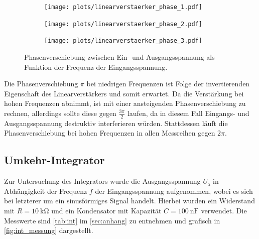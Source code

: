 \begin{figure}[H]
  \centering
  \begin{subfigure}{.65\textwidth}
    \texttt{[image: plots/linearverstaerker\_phase\_1.pdf]}
  \end{subfigure}
  \begin{subfigure}{.65\textwidth}
    \texttt{[image: plots/linearverstaerker\_phase\_2.pdf]}
  \end{subfigure}
  \begin{subfigure}{.65\textwidth}
    \texttt{[image: plots/linearverstaerker\_phase\_3.pdf]}
  \end{subfigure}
  \caption{Phasenverschiebung zwischen Ein- und Ausgangsspannung als Funktion der Frequenz der Eingangsspannung.}
  \label{fig:phase}
\end{figure}
Die Phasenverschiebung $\pi$ bei niedrigen Frequenzen ist Folge der invertierenden Eigenschaft des Linearverstärkers und somit erwartet. Da die Verstärkung bei hohen Frequenzen abnimmt, ist mit einer ansteigenden Phasenverschiebung zu rechnen, allerdings sollte diese gegen $\frac{3\pi}{2}$ laufen, da in diesem Fall Eingangs- und Ausgangsspannung destruktiv interferieren würden. Stattdessen läuft die Phasenverschiebung bei hohen Frequenzen in allen Messreihen gegen $2\pi$.

\newpage
\subsection{Umkehr-Integrator}
Zur Untersuchung des Integrators wurde die Ausgangsspannung $U_\mathrm{a}$ in Abhängigkeit der Frequenz $f$ der Eingangsspannung aufgenommen, wobei es sich bei letzterer um ein sinusförmiges Signal handelt. Hierbei wurden ein Widerstand mit $R = \SI{10}{\kilo\ohm}$ und ein Kondensator mit Kapazität $C = \SI{100}{\nano\farad}$ verwendet. Die Messwerte sind \autoref{tab:int} im \autoref{sec:anhang} zu entnehmen und grafisch in \autoref{fig:int_messung} dargestellt.

